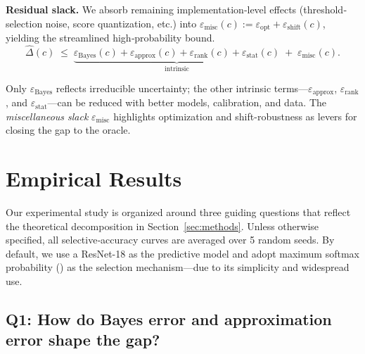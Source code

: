 \textbf{Residual slack.}  We absorb remaining implementation‐level effects (threshold‐selection noise, score quantization, etc.) into $\varepsilon_{\text{misc}}(c) :=\varepsilon_{\text{opt}}+\varepsilon_{\text{shift}}(c)$, yielding the streamlined high‐probability bound.
\begin{equation}
  \widehat\Delta(c)
  \;\le\;
  \underbrace{\varepsilon_{\text{Bayes}}(c)
               +\varepsilon_{\text{approx}}(c)
               +\varepsilon_{\text{rank}}(c)
               +\varepsilon_{\text{stat}}(c)}_{\text{intrinsic}}
  \;+\;
  \varepsilon_{\text{misc}}(c).
\end{equation}

\begin{takeaway}
Only \(\varepsilon_{\text{Bayes}}\) reflects irreducible uncertainty; the other intrinsic terms—\(\varepsilon_{\text{approx}}\), \(\varepsilon_{\text{rank}}\), and \(\varepsilon_{\text{stat}}\)—can be reduced with better models, calibration, and data. The \emph{miscellaneous slack} \(\varepsilon_{\text{misc}}\) highlights optimization and shift-robustness as levers for closing the gap to the oracle.
\end{takeaway}


\section{Empirical Results}
\label{sec:experiments}

Our experimental study is organized around three guiding questions that reflect the theoretical decomposition in Section~\ref{sec:methods}. Unless otherwise specified, all selective‑accuracy curves are averaged over 5 random seeds. By default, we use a ResNet-18 as the predictive model and adopt maximum softmax probability (\msp) as the selection mechanism---due to its simplicity and widespread use.

\subsection{Q1: How do Bayes error and approximation error shape the gap?}

